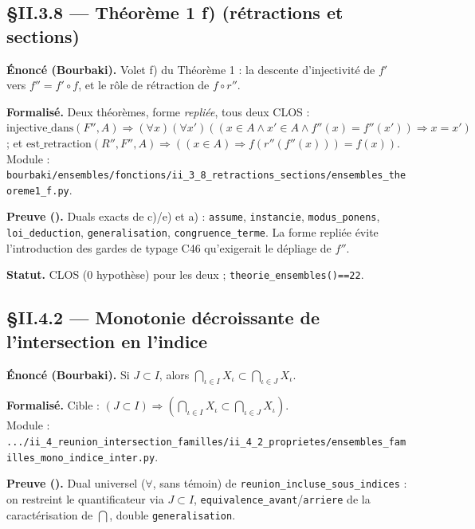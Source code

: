 
\subsection{§II.3.8 --- Théorème 1 f) (rétractions et sections)}
\textbf{Énoncé (Bourbaki).} Volet f) du Théorème 1 : la descente d'injectivité de
$f'$ vers $f''=f'\circ f$, et le rôle de rétraction de $f\circ r''$.

\textbf{Formalisé.} Deux théorèmes, forme \emph{repliée}, tous deux CLOS :
$\mathrm{injective\_dans}(F'',A) \Rightarrow (\forall x)(\forall x')((x\in A \wedge x'\in A \wedge f''(x)=f''(x')) \Rightarrow x=x')$ ;
et $\mathrm{est\_retraction}(R'',F'',A) \Rightarrow ((x\in A) \Rightarrow f(r''(f''(x)))=f(x))$. \\
Module : \texttt{bourbaki/ensembles/fonctions/ii\_3\_8\_retractions\_sections/ensembles\_theoreme1\_f.py}.

\textbf{Preuve (\Nstar).} Duals exacts de c)/e) et a) : \texttt{assume},
\texttt{instancie}, \texttt{modus\_ponens}, \texttt{loi\_deduction},
\texttt{generalisation}, \texttt{congruence\_terme}. La forme repliée évite
l'introduction des gardes de typage C46 qu'exigerait le dépliage de $f''$.

\textbf{Statut.} CLOS (0 hypothèse) pour les deux ; \texttt{theorie\_ensembles()==22}.

\subsection{§II.4.2 --- Monotonie décroissante de l'intersection en l'indice}
\textbf{Énoncé (Bourbaki).} Si $J\subset I$, alors
$\bigcap_{\iota\in I}X_\iota \subset \bigcap_{\iota\in J}X_\iota$.

\textbf{Formalisé.} Cible : $(J\subset I) \Rightarrow (\bigcap_{\iota\in I}X_\iota \subset \bigcap_{\iota\in J}X_\iota)$. \\
Module : \texttt{.../ii\_4\_reunion\_intersection\_familles/ii\_4\_2\_proprietes/ensembles\_familles\_mono\_indice\_inter.py}.

\textbf{Preuve (\Nstar).} Dual universel ($\forall$, sans témoin) de
\texttt{reunion\_incluse\_sous\_indices} : on restreint le quantificateur via
$J\subset I$, \texttt{equivalence\_avant}/\texttt{arriere} de la caractérisation
de $\bigcap$, double \texttt{generalisation}.

